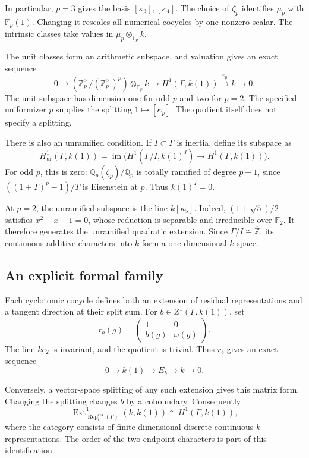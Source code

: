 In particular, \(p=3\) gives the basis \([\kappa_3],[\kappa_4]\).
The choice of \(\zeta_p\) identifies \(\mu_p\) with \(\mathbb F_p(1)\).
Changing it rescales all numerical cocycles by one nonzero scalar.
The intrinsic classes take values in \(\mu_p\otimes_{\mathbb F_p}k\).

The unit classes form an arithmetic subspace, and valuation gives an
exact sequence
\[
 0\longrightarrow
 (\mathbb Z_p^\times/(\mathbb Z_p^\times)^p)\otimes_{\mathbb F_p}k
 \longrightarrow H^1(\Gamma,k(1))
 \xrightarrow{v_p}k\longrightarrow0.
\]
The unit subspace has dimension one for odd \(p\) and two for \(p=2\).
The specified uniformizer \(p\) supplies the splitting
\(1\mapsto[\kappa_p]\). The quotient itself does not specify a splitting.

There is also an unramified condition. If \(I\subset \Gamma\) is inertia,
define its subspace as
\[
 H^1_{\mathrm{ur}}(\Gamma,k(1))
 =\operatorname{im}\bigl(H^1(\Gamma/I,k(1)^I)\to H^1(\Gamma,k(1))\bigr).
\]
For odd \(p\), this is zero: \(\mathbb Q_p(\zeta_p)/\mathbb Q_p\) is
totally ramified of degree \(p-1\), since \(((1+T)^p-1)/T\) is Eisenstein at \(p\). Thus \(k(1)^I=0\).

At \(p=2\), the unramified subspace is the line \(k[\kappa_5]\).
Indeed, \((1+\sqrt5)/2\) satisfies \(x^2-x-1=0\), whose reduction
is separable and irreducible over \(\mathbb F_2\).
It therefore generates the unramified quadratic extension.
Since \(\Gamma/I\cong\widehat{\mathbb Z}\), its continuous additive
characters into \(k\) form a one-dimensional \(k\)-space.

\subsection{An explicit formal family}

Each cyclotomic cocycle defines both an extension of residual
representations and a tangent direction at their split sum.
For \(b\in Z^1(\Gamma,k(1))\), set
\[
 r_b(g)=\begin{pmatrix}1&0\\b(g)&\omega(g)\end{pmatrix}.
\]
The line \(ke_2\) is invariant, and the quotient is trivial. Thus
\(r_b\) gives an exact sequence
\[
 0\longrightarrow k(1)\longrightarrow E_b\longrightarrow k\longrightarrow0.
\]

Conversely, a vector-space splitting of any such extension gives this
matrix form. Changing the splitting changes \(b\) by a coboundary.
Consequently
\[
 \operatorname{Ext}^1_{\operatorname{Rep}^{\mathrm{cts}}_k(\Gamma)}(k,k(1))
 \cong H^1(\Gamma,k(1)),
\]
where the category consists of finite-dimensional discrete continuous
\(k\)-representations. The order of the two endpoint characters is
part of this identification.

